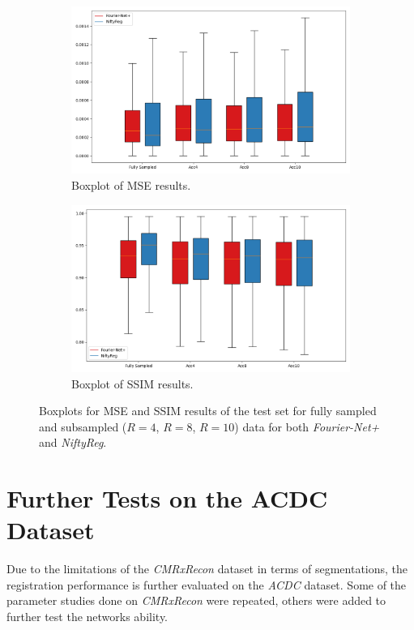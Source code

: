 \documentclass[english,version-2022-01]{uzl-thesis} %
\begin{document}
\begin{figure}[h] %
	\centering
	\graphicspath{{images/}{\main/images/}}
	\begin{subfigure}{0.495\textwidth}
    		\includegraphics[width=\textwidth]{TestBenchmark_MSE_Boxplots.png}
    		\caption{Boxplot of MSE results.}
    		\label{fig:TestBenchmark_MSE_Boxplots}
	\end{subfigure}
	\hfill
	\begin{subfigure}{0.495\textwidth}
    		\includegraphics[width=\textwidth]{TestBenchmark_SSIM_Boxplots.png}
    		\caption{Boxplot of SSIM results.}
    		\label{fig:TestBenchmark_SSIM_Boxplots}
	\end{subfigure}
	\caption{Boxplots for MSE and SSIM results of the test set for fully sampled and subsampled ($R=4$, $R=8$, $R=10$) data for both \emph{Fourier-Net+} and \emph{NiftyReg}.}
	\label{fig:TestBenchmark_Boxplots}
\end{figure}

\section{Further Tests on the ACDC Dataset}
Due to the limitations of the \emph{CMRxRecon} dataset in terms of segmentations, the registration performance is further evaluated on the \emph{ACDC} dataset. Some of the parameter studies done on \emph{CMRxRecon} were repeated, others were added to further test the networks ability.
\end{document}
